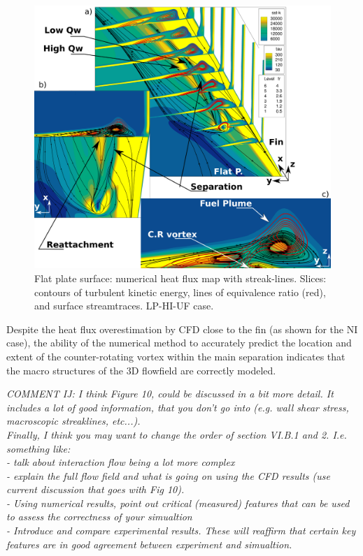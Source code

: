 \documentclass{AIAA}
\begin{document}
\begin{figure}[!h]
\center
\includegraphics[trim = 0mm 0mm 0mm 0mm, clip, width=0.95\columnwidth,valign=t]{Figures/Flowfield_Experimental_Vred_V2.pdf}
\caption{Flat plate surface: numerical heat flux map with streak-lines. Slices: contours of turbulent kinetic energy, lines of equivalence ratio (red), and surface streamtraces. LP-HI-UF case.}
\label{fig:Exper_Flowf}
\end{figure} 


Despite the heat flux overestimation by CFD close to the fin (as shown for the NI case), the ability of the numerical method to accurately predict the location and extent of the counter-rotating vortex within the main separation indicates that the macro structures of the 3D flowfield are correctly modeled.

{\it COMMENT IJ: I think Figure 10, could be discussed in a bit more detail. It includes a lot of good information, that you don't go into (e.g. wall shear stress, macroscopic streaklines, etc...). \\ 
Finally, I think you may want to change the order of section VI.B.1 and 2. I.e. something like:\\
- talk about interaction flow being a lot more complex\\
- explain the full flow field and what is going on using the CFD results (use current discussion that goes with Fig 10).\\ 
- Using numerical results, point out critical (measured) features that can be used to assess the correctness of your simualtion \\
- Introduce and compare experimental results. These will reaffirm that certain key features are in good agreement between experiment and simualtion.
}
\end{document}
